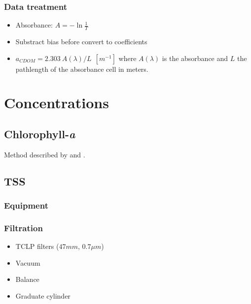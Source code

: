 \begin{appendices}
\subsubsection{Data treatment}
\begin{itemize}
  \item Absorbance: $A=-\ln{\displaystyle\frac{1}{T}}$ 
  \item Substract bias before convert to coefficients
  \item $a_{CDOM}=2.303~A(\lambda)/L~~[m^{-1}]$ where $A(\lambda)$ is the absorbance and $L$ the pathlength of the absorbance cell in meters.
\end{itemize}
\section{Concentrations}
\subsection{Chlorophyll-{\it a}}

Method described by \cite{Lorenzen:1967fk} and \cite{Ritchie:2008eu}.

\subsection{TSS}

\subsubsection{Equipment}
\subsubsection*{Filtration}
\begin{itemize}

  \item TCLP filters ($47 mm$, $0.7\mu m$)
  \item Vacuum
  \item Balance
  \item Graduate cylinder

\end{itemize}


\end{appendices}
